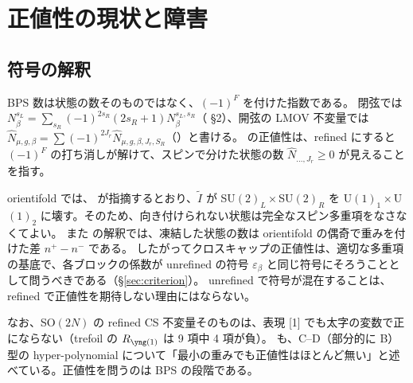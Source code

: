 \section{正値性の現状と障害}\label{sec:positivity}

\subsection{符号の解釈}
BPS 数は状態の数そのものではなく、$(-1)^F$ を付けた指数である。
閉弦では $N^{s_L}_\beta = \sum_{s_R}(-1)^{2s_R}(2s_R + 1)N^{s_L,s_R}_\beta$（\cite{AgSc12} §2）、開弦の LMOV 不変量では $\hat N_{\mu,g,\beta} = \sum(-1)^{2J_r}\hat N_{\mu,g,\beta,J_r,S_R}$（\cite{KN17}）と書ける。
\cite{KN17} の正値性は、refined にすると $(-1)^F$ の打ち消しが解けて、スピンで分けた状態の数 $\hat N_{\dots,J_r} \ge 0$ が見えることを指す。

orientifold では、\cite{AgSc12} が指摘するとおり、$\tilde I$ が SU$(2)_L\times$SU$(2)_R$ を U$(1)_1\times$U$(1)_2$ に壊す。そのため、向き付けられない状態は完全なスピン多重項をなさなくてよい。
また \cite{PU14} の解釈では、凍結した状態の数は orientifold の偶奇で重みを付けた差 $n^+ - n^-$ である。
したがってクロスキャップの正値性は、適切な多重項の基底で、各ブロックの係数が unrefined の符号 $\varepsilon_\beta$ と同じ符号にそろうこととして問うべきである（§\ref{sec:criterion}）。
unrefined で符号が混在することは、refined で正値性を期待しない理由にはならない。

なお、SO$(2N)$ の refined CS 不変量そのものは、表現 [1] でも太字の変数で正にならない（trefoil の $R_{\yone}$ は 9 項中 4 項が負）。\cite{Cherednik11} も、C--D（部分的に B）型の hyper-polynomial について「最小の重みでも正値性はほとんど無い」と述べている。正値性を問うのは BPS の段階である。

